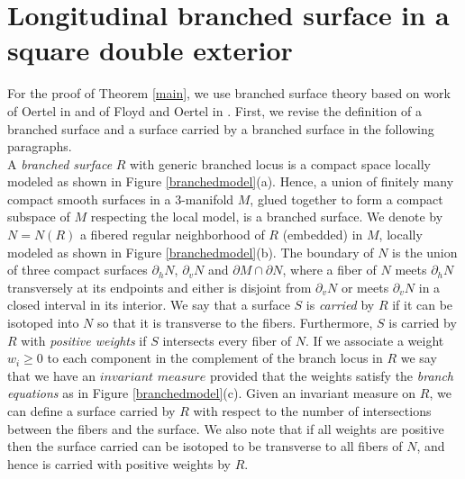 \documentclass[reqno]{amsart}
\theoremstyle{definition}
\theoremstyle{remark}
\begin{document}
\section{Longitudinal branched surface in a square double exterior}\label{section: branched surface}

For the proof of Theorem \ref{main}, we use branched surface theory based on work of Oertel in \cite{Oertel-84} and of Floyd and Oertel in \cite{Floyd-Oertel}.  First, we revise the definition of a branched surface and a surface carried by a branched surface in the following paragraphs.\\ 



A \textit{branched surface} $R$ with generic branched locus is a compact space locally modeled as shown in Figure \ref{branchedmodel}(a). Hence, a union of finitely many compact smooth surfaces in a $3$-manifold $M$, glued together to form a compact subspace of $M$ respecting the local model, is a branched surface. We denote by $N=N(R)$ a fibered regular neighborhood of $R$ (embedded) in $M$, locally modeled as shown in Figure \ref{branchedmodel}(b). The boundary of $N$ is the union of three compact surfaces $\partial_h N$, $\partial_v N$ and $\partial M\cap \partial N$, where a fiber of $N$ meets $\partial_h N$ transversely at its endpoints and either is disjoint from $\partial_v N$ or meets $\partial_v N$ in a closed interval in its interior. We say that a surface $S$ is \textit{carried} by $R$ if it can be isotoped into $N$ so that it is transverse to the fibers. Furthermore, $S$ is carried by $R$ with \textit{positive weights} if $S$ intersects every fiber of $N$. If we associate a weight $w_i\geq 0$ to each component in the complement of the branch locus in $R$ we say that we have an $\textit{invariant measure}$ provided that the weights satisfy the \textit{branch equations} as in Figure \ref{branchedmodel}(c). Given an invariant measure on $R$, we can define a surface carried by $R$ with respect to the number of intersections between the fibers and the surface. We also note that if all weights are positive then the surface carried can be isotoped to be transverse to all fibers of $N$, and hence is carried with positive weights by $R$.
\end{document}
